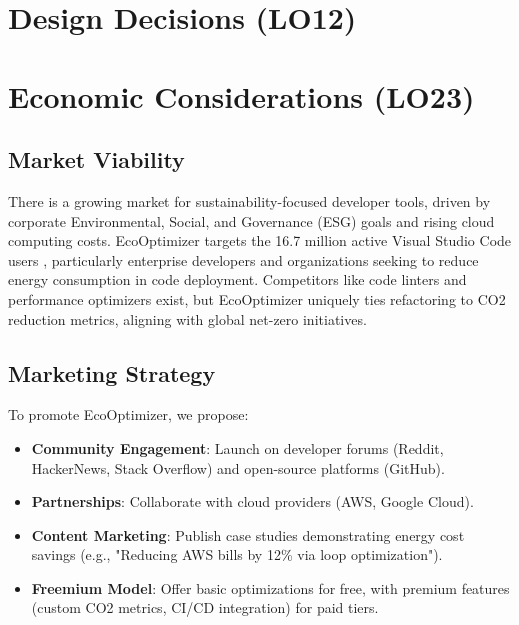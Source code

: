 \documentclass{article}
\begin{document}



\section{Design Decisions (LO12)}


\section{Economic Considerations (LO23)}



\subsection{Market Viability}
There is a growing market for sustainability-focused developer tools, 
driven by corporate Environmental, Social, and Governance (ESG) goals 
and rising cloud computing costs. EcoOptimizer targets the 16.7 million 
active Visual Studio Code users \cite{vscodeUsers}, 
particularly enterprise developers and organizations seeking to reduce 
energy consumption in code deployment. Competitors like code linters and 
performance optimizers exist, but EcoOptimizer 
uniquely ties refactoring 
to CO2 reduction metrics, aligning with global net-zero initiatives.

\subsection{Marketing Strategy}
To promote EcoOptimizer, we propose:
\begin{itemize}
    \item \textbf{Community Engagement}: Launch on developer forums (Reddit, HackerNews, Stack Overflow) and open-source platforms (GitHub).
    \item \textbf{Partnerships}: Collaborate with cloud providers (AWS, Google Cloud).
    \item \textbf{Content Marketing}: Publish case studies demonstrating energy cost savings (e.g., "Reducing AWS bills by 12\% via loop optimization").
    \item \textbf{Freemium Model}: Offer basic optimizations for free, with premium features (custom CO2 metrics, CI/CD integration) for paid tiers.
\end{itemize}
\end{document}
